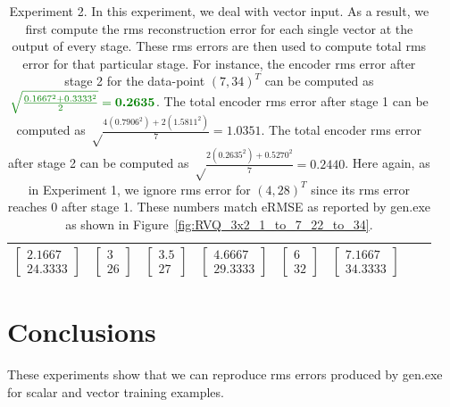 \begin{table}[t]
\begin{tabular}{|l||c|c|c|c|c|c|c|}
$\left[\begin{array}{c}2.1667 \\24.3333\end{array}\right]$		&  
$\left[\begin{array}{c}3 \\26\end{array}\right]$   				&  
$\left[\begin{array}{c}3.5 \\27\end{array}\right]$   				&  
$\left[\begin{array}{c}4.6667 \\29.3333\end{array}\right]$   	&  
$\left[\begin{array}{c}6 \\32\end{array}\right]$     				& 
$\left[\begin{array}{c}7.1667 \\34.3333\end{array}\right]$ 		\\
\hline
\end{tabular}
\caption{Experiment 2.  In this experiment, we deal with vector input.  As a result, we first compute the rms reconstruction error for each single vector at the output of every stage.  These rms errors are then used to compute total rms error for that particular stage.  For instance, the encoder rms error after stage 2 for the data-point $(7,34)^T$ can be computed as $\color{darkgreen}\sqrt{\frac{0.1667^2+ 0.3333^2}{2}}={\textbf{\color{darkgreen}0.2635}}$.  The total encoder rms error after stage 1 can be computed as  {\color{blue}$\sqrt \frac{4(0.7906^2) + 2(1.5811^2)}{7} = 1.0351$}.  The total encoder rms error after stage 2 can be computed as {\color{darkgreen}$\sqrt \frac{2(0.2635^2) + 0.5270^2}{7} = 0.2440$}.  Here again, as in Experiment 1, we ignore rms error for $(4,28)^T$ since its rms error reaches 0 after stage 1.  These numbers match eRMSE as reported by gen.exe as shown in Figure~\ref{fig:RVQ_3x2_1_to_7_22_to_34}.}
\label{table:Exp2_detailed_computations}
\end{table}

\section{Conclusions}
These experiments show that we can reproduce rms errors produced by gen.exe for scalar and vector training examples.


